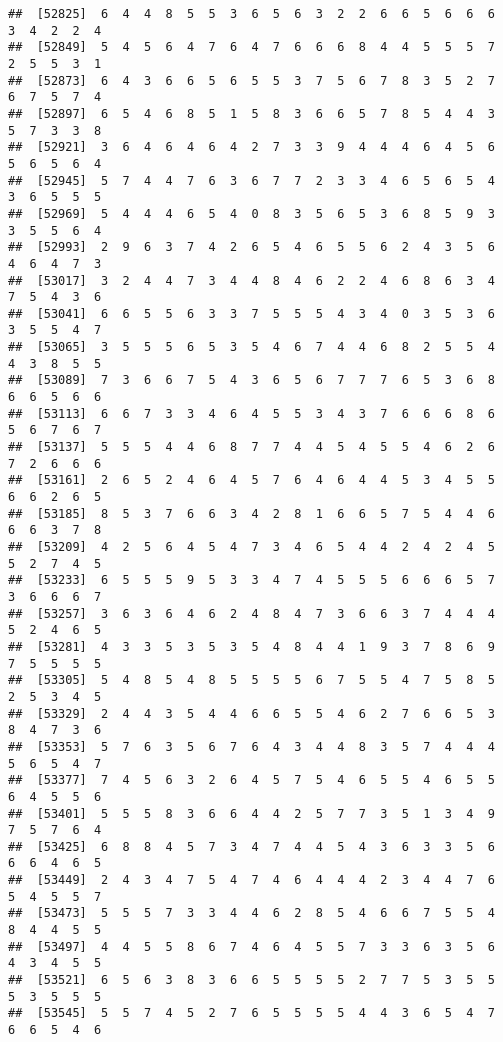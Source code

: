 \documentclass[
]{book}
\begin{document}
\begin{verbatim}
##  [52825]  6  4  4  8  5  5  3  6  5  6  3  2  2  6  6  5  6  6  6  3  4  2  2  4
##  [52849]  5  4  5  6  4  7  6  4  7  6  6  6  8  4  4  5  5  5  7  2  5  5  3  1
##  [52873]  6  4  3  6  6  5  6  5  5  3  7  5  6  7  8  3  5  2  7  6  7  5  7  4
##  [52897]  6  5  4  6  8  5  1  5  8  3  6  6  5  7  8  5  4  4  3  5  7  3  3  8
##  [52921]  3  6  4  6  4  6  4  2  7  3  3  9  4  4  4  6  4  5  6  5  6  5  6  4
##  [52945]  5  7  4  4  7  6  3  6  7  7  2  3  3  4  6  5  6  5  4  3  6  5  5  5
##  [52969]  5  4  4  4  6  5  4  0  8  3  5  6  5  3  6  8  5  9  3  3  5  5  6  4
##  [52993]  2  9  6  3  7  4  2  6  5  4  6  5  5  6  2  4  3  5  6  4  6  4  7  3
##  [53017]  3  2  4  4  7  3  4  4  8  4  6  2  2  4  6  8  6  3  4  7  5  4  3  6
##  [53041]  6  6  5  5  6  3  3  7  5  5  5  4  3  4  0  3  5  3  6  3  5  5  4  7
##  [53065]  3  5  5  5  6  5  3  5  4  6  7  4  4  6  8  2  5  5  4  4  3  8  5  5
##  [53089]  7  3  6  6  7  5  4  3  6  5  6  7  7  7  6  5  3  6  8  6  6  5  6  6
##  [53113]  6  6  7  3  3  4  6  4  5  5  3  4  3  7  6  6  6  8  6  5  6  7  6  7
##  [53137]  5  5  5  4  4  6  8  7  7  4  4  5  4  5  5  4  6  2  6  7  2  6  6  6
##  [53161]  2  6  5  2  4  6  4  5  7  6  4  6  4  4  5  3  4  5  5  6  6  2  6  5
##  [53185]  8  5  3  7  6  6  3  4  2  8  1  6  6  5  7  5  4  4  6  6  6  3  7  8
##  [53209]  4  2  5  6  4  5  4  7  3  4  6  5  4  4  2  4  2  4  5  5  2  7  4  5
##  [53233]  6  5  5  5  9  5  3  3  4  7  4  5  5  5  6  6  6  5  7  3  6  6  6  7
##  [53257]  3  6  3  6  4  6  2  4  8  4  7  3  6  6  3  7  4  4  4  5  2  4  6  5
##  [53281]  4  3  3  5  3  5  3  5  4  8  4  4  1  9  3  7  8  6  9  7  5  5  5  5
##  [53305]  5  4  8  5  4  8  5  5  5  5  6  7  5  5  4  7  5  8  5  2  5  3  4  5
##  [53329]  2  4  4  3  5  4  4  6  6  5  5  4  6  2  7  6  6  5  3  8  4  7  3  6
##  [53353]  5  7  6  3  5  6  7  6  4  3  4  4  8  3  5  7  4  4  4  5  6  5  4  7
##  [53377]  7  4  5  6  3  2  6  4  5  7  5  4  6  5  5  4  6  5  5  6  4  5  5  6
##  [53401]  5  5  5  8  3  6  6  4  4  2  5  7  7  3  5  1  3  4  9  7  5  7  6  4
##  [53425]  6  8  8  4  5  7  3  4  7  4  4  5  4  3  6  3  3  5  6  6  6  4  6  5
##  [53449]  2  4  3  4  7  5  4  7  4  6  4  4  4  2  3  4  4  7  6  5  4  5  5  7
##  [53473]  5  5  5  7  3  3  4  4  6  2  8  5  4  6  6  7  5  5  4  8  4  4  5  5
##  [53497]  4  4  5  5  8  6  7  4  6  4  5  5  7  3  3  6  3  5  6  4  3  4  5  5
##  [53521]  6  5  6  3  8  3  6  6  5  5  5  5  2  7  7  5  3  5  5  5  3  5  5  5
##  [53545]  5  5  7  4  5  2  7  6  5  5  5  5  4  4  3  6  5  4  7  6  6  5  4  6

\end{verbatim}
\end{document}
